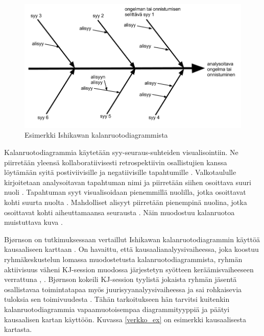 \begin{figure}[ht!]
\centering
\includegraphics[width=150mm]{ishikawa_esimerkki.png}
\caption{Esimerkki Ishikawan kalanruotodiagrammista}
\label{ishikawa_ex}
\end{figure}

Kalanruotodiagrammia käytetään syy-seuraus-suhteiden visualisointiin. Ne piirretään yleensä kollaboratiivisesti retrospektiivin osallistujien kanssa löytämään syitä postiviivisille ja negatiivisille tapahtumille \citep{birk2002postmortem}. Valkotaululle kirjoitetaan analysoitavan tapahtuman nimi ja piirretään siihen osoittava suuri nuoli \citep{Bjornson2009}. Tapahtuman syyt visualisoidaan pienemmillä nuolilla, jotka osoittavat kohti suurta nuolta \citep{Bjornson2009}. Mahdolliset alisyyt piirretään pienempinä nuolina, jotka osoittavat kohti aiheuttamaansa seurausta \citep{Bjornson2009}. Näin muodostuu kalanruotoa muistuttava kuva \citep{birk2002postmortem}.

Bj{\o}rnson on tutkimuksessaan vertaillut Ishikawan kalanruotodiagrammin käyttöä kausaaliseen karttaan \citep{Bjornson2009}. On havaittu, että kausaalianalyysivaiheessa, joka koostuu ryhmäkeskustelun lomassa muodostetusta kalanruotodiagrammista, ryhmän aktiivisuus väheni KJ-session muodossa järjestetyn syötteen keräämisvaiheeseen verrattuna \citep{Bjornson2009}, \citep{staalhane2003post}. Bj{\o}rnson kokeili KJ-session tyylistä jokaista ryhmän jäsentä osallistavaa toimintatapaa myös juurisyyanalyysivaiheessa  ja sai rohkaisevia tuloksia sen toimivuudesta \citep{Bjornson2009}. Tähän tarkoitukseen hän tarvitsi kuitenkin kalanruotodiagrammia vapaamuotoisempaa diagrammityyppiä ja päätyi kausaalisen kartan käyttöön. Kuvassa \ref{verkko_ex} on esimerkki kausaalisesta kartasta.

